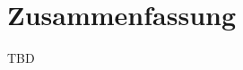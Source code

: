 \documentclass[a4paper,bibtotoc,oneside]{scrbook}
\begin{document}



\chapter{Zusammenfassung}
TBD



\end{document}
